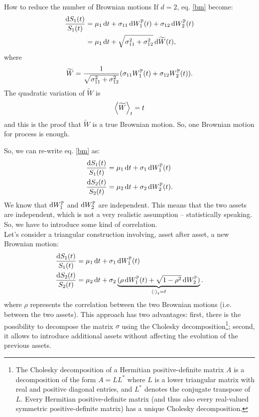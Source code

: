 \begin{example}{How to reduce the number of Brownian motions}{}{}
    If $d=2$, eq. \eqref{bm} become:
    \begin{align}
        \dfrac{\dd S_1(t)}{S_1(t)} &= \mu_1\,\dd t + \sigma_{11}\,\dd W_1^{\mathbb{P}}(t) + \sigma_{12}\,\dd W_2^{\mathbb{P}}(t) \\
        &=
        \mu_1\,\dd t + \sqrt{\sigma_{11}^2 + \sigma_{12}^2}\,\dd \widetilde{W}(t),
    \end{align}
    where
    \begin{equation}
        \widetilde{W} = \dfrac{1}{\sqrt{\sigma_{11}^2 + \sigma_{12}^2}}(\sigma_{11}W_1^{\mathbb{P}}(t) + \sigma_{12}W_2^{\mathbb{P}}(t)).
    \end{equation}
    The quadratic variation of $\widetilde{W}$ is
    \begin{equation}
        \expval{\widetilde{W}}_t = t
    \end{equation}
    and this is the proof that $\widetilde{W}$ is a true Brownian motion. So, one Brownian motion for process is enough.
\end{example}
So, we can re-write eq. \eqref{bm} as:
\begin{align}
    \dfrac{\dd S_1(t)}{S_1(t)} &= \mu_1\,\dd t + \sigma_{1}\,\dd W_1^{\mathbb{P}}(t) \\
    \dfrac{\dd S_2(t)}{S_2(t)} &= \mu_2\,\dd t + \sigma_{2}\,\dd W_2^{\mathbb{P}}(t).
\end{align}
We know that $\dd W_1^{\mathbb{P}}$ and $\dd W_2^{\mathbb{P}}$ are independent. This means that the two assets are independent, which is not a very realistic assumption -- statistically speaking. So, we have to introduce some kind of correlation.\\
Let's consider a triangular construction involving, asset after asset, a new Brownian motion:
\begin{align}
    \dfrac{\dd S_1(t)}{S_1(t)} &= \mu_1\,\dd t + \sigma_{1}\,\dd W_1^{\Pmeas}(t) \\
    \dfrac{\dd S_2(t)}{S_2(t)} &= \mu_2\,\dd t + \sigma_{2}\underbrace{(\rho\,\dd W_1^{\Pmeas}(t) + \sqrt{1-\rho^2}\,\dd W_2^{\Pmeas})}_{\expval{\cdot}_t=t}. %
\end{align}
where $\rho$ represents the correlation between the two Brownian motions (i.e. between the two assets). This approach has two advantages: first, there is the possibility to decompose the matrix $\sigma$ using the Cholesky decomposition\footnote{The Cholesky decomposition of a Hermitian positive-definite matrix $A$ is a decomposition of the form
$A=LL^*$ where $L$ is a lower triangular matrix with real and positive diagonal entries, and $L^*$ denotes the conjugate transpose of $L$. Every Hermitian positive-definite matrix (and thus also every real-valued symmetric positive-definite matrix) has a unique Cholesky decomposition.}; second, it allows to introduce additional assets without affecting the evolution of the previous assets.


